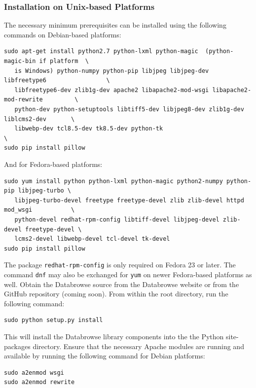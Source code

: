 \documentclass[10pt]{article}
\begin{document}
\subsubsection{Installation on Unix-based Platforms}

The necessary minimum prerequisites can be installed using the following commands on Debian-based platforms:

\begin{verbatim}
sudo apt-get install python2.7 python-lxml python-magic  (python-magic-bin if platform  \
   is Windows) python-numpy python-pip libjpeg libjpeg-dev libfreetype6                 \
   libfreetype6-dev zlib1g-dev apache2 libapache2-mod-wsgi libapache2-mod-rewrite	      \
   python-dev python-setuptools libtiff5-dev libjpeg8-dev zlib1g-dev liblcms2-dev       \
   libwebp-dev tcl8.5-dev tk8.5-dev python-tk                                           \
sudo pip install pillow
\end{verbatim}

And for Fedora-based platforms:

\begin{verbatim}
sudo yum install python python-lxml python-magic python2-numpy python-pip libjpeg-turbo \
   libjpeg-turbo-devel freetype freetype-devel zlib zlib-devel httpd mod_wsgi           \
   python-devel redhat-rpm-config libtiff-devel libjpeg-devel zlib-devel freetype-devel \
   lcms2-devel libwebp-devel tcl-devel tk-devel
sudo pip install pillow
\end{verbatim}

The package \texttt{redhat-rpm-config} is only required on Fedora 23 or later.  The command \texttt{dnf} may also be exchanged for \texttt{yum} on newer Fedora-based platforms as well.  Obtain the Databrowse source from the Databrowse website or from the GitHub repository (coming soon).  From within the root directory, run the following command:

\begin{verbatim}
sudo python setup.py install
\end{verbatim}

This will install the Databrowse library components into the the Python site-packages directory.  Ensure that the necessary Apache modules are running and available by running the following command for Debian platforms:

\begin{verbatim}
sudo a2enmod wsgi
sudo a2enmod rewrite
\end{verbatim}
\end{document}
